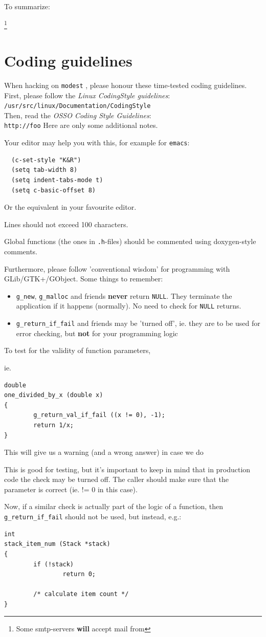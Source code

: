 \documentclass{book}
\newcommand{\modest}{{\tt modest} }
\begin{document}
To summarize:

\footnote{Some smtp-servers {\bf will} accept mail
  from} 



\chapter*{Coding guidelines}
When hacking on \modest, please honour these time-tested coding guidelines.
First, please follow the {\em Linux CodingStyle guidelines}:\\
       {\tt /usr/src/linux/Documentation/CodingStyle}\\
Then, read the {\em OSSO Coding Style Guidelines}:\\
        {\tt http://foo}
Here are only some additional notes.

Your editor may help you with this, for example for {\tt emacs}:
\begin{verbatim}
  (c-set-style "K&R")
  (setq tab-width 8)
  (setq indent-tabs-mode t)
  (setq c-basic-offset 8)
\end{verbatim}

Or the equivalent in your favourite editor.

Lines should not exceed 100 characters.

Global functions (the ones in {\tt .h}-files) should be commented using 
doxygen-style comments.

Furthermore, please follow 'conventional wisdom' for programming with 
GLib/GTK+/GObject. Some things to remember:
\begin{itemize}
\item {\tt g\_new}, {\tt g\_malloc} and friends {\bf never} return {\tt NULL}. They terminate
  the application if it happens (normally). No need to check for {\tt NULL} returns.
\item {\tt g\_return\_if\_fail} and friends may be 'turned off', ie. they are
  to be used for error checking, but {\bf not} for your programming logic
\end{itemize}

To test for the validity of function parameters,

ie.
\begin{verbatim}
double
one_divided_by_x (double x)
{
        g_return_val_if_fail ((x != 0), -1);
        return 1/x;     
}
\end{verbatim}
This will give us a warning (and a wrong answer) in case we do

This is good for testing, but it's important to keep in mind that in
production code the check may be turned off. The caller should make
sure that the parameter is correct (ie. != 0 in this case).

Now, if a similar check is actually part of the logic of a function,
then {\tt g\_return\_if\_fail} should not be used, but instead, e.g.:
\begin{verbatim}
int
stack_item_num (Stack *stack)
{
        if (!stack)
                return 0;

        /* calculate item count */
}
\end{verbatim}
\end{document}
